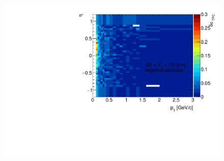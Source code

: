 \begin{figure}[H]\ContinuedFloat
	\vspace{-3.5em}
	\parbox{0.325\textwidth}{
		\includegraphics[width=\linewidth,page=16]{graphics/systematicsEfficiency/deadMaterial/secondaries_Unbinned_Charged_CD.pdf}\\
	}~
	\vspace{-4em}
\end{figure}
